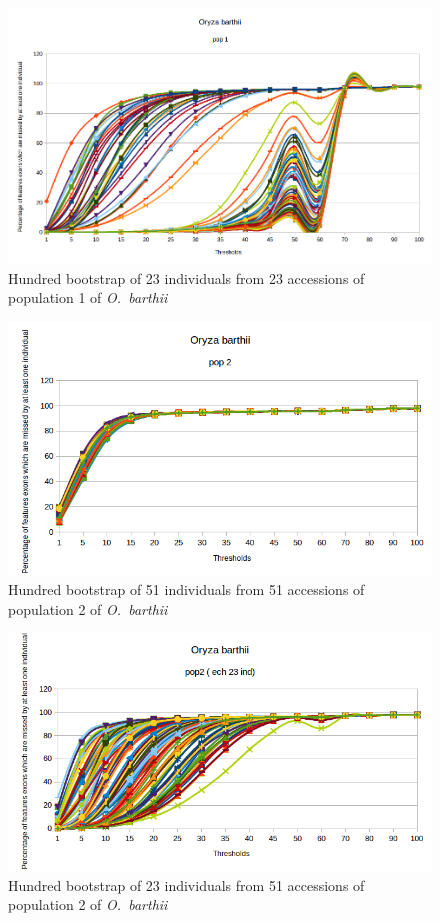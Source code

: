 \documentclass[10pt,letterpaper]{article}
\begin{document}
\begin{figure}
\centering
 \includegraphics[scale=0.7]{determinationSeuilsBootstrapBarExF_pop1.png}
 \caption{Hundred bootstrap of 23 individuals from 23 accessions of population 1 of \emph{O.~barthii}}
 \label{BootstrapPOP1}
\end{figure}

\begin{figure}
\centering
 \includegraphics[scale=0.7]{determinationSeuilsBootstrapBarExF_pop2.png}
 \caption{Hundred bootstrap of 51 individuals from 51 accessions of population 2 of \emph{O.~barthii}}
 \label{BootstrapPOP2}
\end{figure}

\begin{figure}
\centering
 \includegraphics[scale=0.7]{determinationSeuilsBootstrapBarExF_pop2_ech23.png}
 \caption{Hundred bootstrap of 23 individuals from 51 accessions of population 2 of \emph{O.~barthii}}
 \label{BootstrapPOP2bis}
\end{figure}
\end{document}
